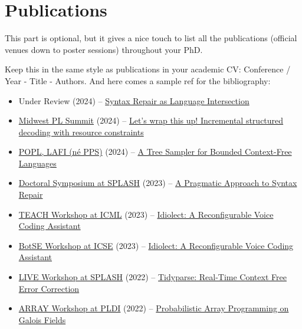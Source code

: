 \chapter*{\rm\bfseries Publications}
\label{ch:publications}

This part is optional, but it gives a nice touch to list all the publications (official venues down to poster sessions) throughout your PhD.

Keep this in the same style as publications in your academic CV:
Conference / Year - Title - Authors. And here comes a sample ref for the bibliography: \cite{considine2023pragmatic}

\begin{itemize}
\item Under Review (2024) -- \href{https://breandan.net/public/tidyparse.pdf}{Syntax Repair as Language Intersection}
\item \href{https://pl.cs.uchicago.edu/PLSummit/2024/}{Midwest PL Summit} (2024) -- \href{https://github.com/breandan/galoisenne/blob/master/latex/tacm2024/tacm_poster.pdf}{Let's wrap this up! Incremental structured decoding with resource constraints}
\item \href{https://popl24.sigplan.org/home/lafi-2024}{POPL, LAFI (n\'e PPS)} (2024) -- \href{https://popl24.sigplan.org/home/lafi-2024}{A Tree Sampler for Bounded Context-Free Languages}
\item \href{https://2023.splashcon.org/track/splash-2023-Doctoral-Symposium}{Doctoral Symposium at SPLASH} (2023) -- \href{https://breandan.net/public/pragmatic_syntax_repair.pdf}{A Pragmatic Approach to Syntax Repair}
\item \href{https://sites.google.com/view/teach-icml-23}{TEACH Workshop at ICML} (2023) -- \href{https://github.com/OpenASR/idiolect/blob/master/latex/teach23/teach.pdf}{Idiolect: A Reconfigurable Voice Coding Assistant}
\item \href{http://botse.org/}{BotSE Workshop at ICSE} (2023) -- \href{https://github.com/OpenASR/idiolect/blob/master/latex/botse23/botse.pdf}{Idiolect: A Reconfigurable Voice Coding Assistant}
\item \href{http://liveprog.org/}{LIVE Workshop at SPLASH} (2022) -- \href{https://github.com/breandan/galoisenne/blob/master/latex/splash2022/acmart.pdf}{Tidyparse: Real-Time Context Free Error Correction}
\item \href{https://pldi22.sigplan.org/home/ARRAY-2022#program}{ARRAY Workshop at PLDI} (2022) -- \href{https://github.com/breandan/galoisenne/blob/master/latex/array/acmart.pdf}{Probabilistic Array Programming on Galois Fields}
\end{itemize}

